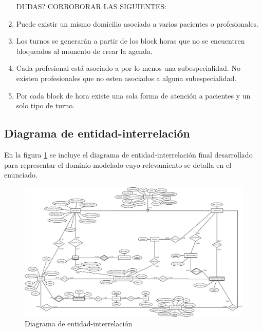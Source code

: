 \documentclass[a4paper,11pt]{article}
\begin{document}
\begin{enumerate}
DUDAS? CORROBORAR LAS SIGUIENTES:

\item Puede existir un mismo domicilio asociado a varios pacientes o profesionales.

\item Los turnos se generarán a partir de los block horas que no se encuentren 
bloqueados al momento de crear la agenda.

\item Cada profesional está asociado a por lo menos una subespecialidad. No existen 
profesionales que no esten asociados a alguna subespecialidad.

\item Por cada block de hora existe una sola forma de atención a pacientes y un 
solo tipo de turno.

\end{enumerate}



\subsection{Diagrama de entidad-interrelación}

 En la figura \ref{fig:der} se incluye el diagrama de entidad-interrelación
 final desarrollado para representar el dominio modelado cuyo relevamiento se
 detalla en el enunciado.

\begin{figure}[h!t]
  \centering
  \includegraphics[width=1.4\textwidth, angle=90]{build/images/der.jpeg}
  \caption{Diagrama de entidad-interrelación} \label{fig:der}
\end{figure}

\FloatBarrier
\end{document}
